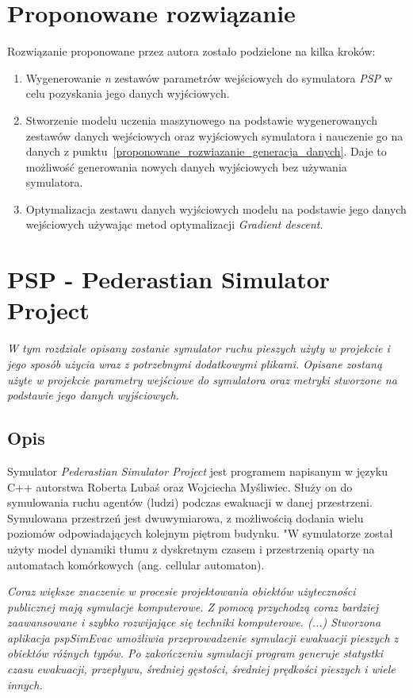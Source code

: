 \documentclass[12pt]{aghdpl}
\begin{document}
	\chapter{Proponowane rozwiązanie}
	Rozwiązanie proponowane przez autora zostało podzielone na kilka kroków:
	\begin{enumerate}
	\item\label{proponowane_rozwiazanie_generacja_danych} Wygenerowanie \textit{n} zestawów parametrów wejściowych do symulatora \textit{PSP} w celu pozyskania jego danych wyjściowych.
	\item Stworzenie modelu uczenia maszynowego na podstawie wygenerowanych zestawów danych wejściowych oraz wyjściowych symulatora i nauczenie go na danych z punktu~\ref{proponowane_rozwiazanie_generacja_danych}. Daje to możliwość generowania nowych danych wyjściowych bez używania symulatora.
	\item Optymalizacja zestawu danych wyjściowych modelu na podstawie jego danych wejściowych używając metod optymalizacji \textit{Gradient descent}.
	\end{enumerate}
	
	\chapter{PSP - Pederastian Simulator Project} \label{sekcja_psp}
	\textit{W tym rozdziale opisany zostanie symulator ruchu pieszych użyty w projekcie i jego sposób użycia wraz z potrzebnymi dodatkowymi plikami. Opisane zostaną użyte w projekcie parametry wejściowe do symulatora oraz metryki stworzone na podstawie jego danych wyjściowych.}
	
		\section{Opis}
		Symulator \textit{Pederastian Simulator Project} jest programem napisanym w języku C++ autorstwa Roberta Lubaś oraz Wojciecha Myśliwiec. Służy on do symulowania ruchu agentów (ludzi) podczas ewakuacji w danej przestrzeni. Symulowana przestrzeń jest dwuwymiarowa, z możliwością dodania wielu poziomów odpowiadających kolejnym piętrom budynku. "W symulatorze został użyty model dynamiki tłumu z dyskretnym czasem i przestrzenią oparty na automatach komórkowych (ang. cellular automaton). \cite{Lubas2016}

		\textit{Coraz większe znaczenie w procesie projektowania obiektów użyteczności publicznej mają symulacje komputerowe. Z pomocą przychodzą coraz bardziej zaawansowane i szybko rozwijające się techniki komputerowe. (...) Stworzona aplikacja pspSimEvac umożliwia przeprowadzenie symulacji ewakuacji pieszych z obiektów różnych typów. Po zakończeniu symulacji program generuje statystki czasu ewakuacji, przepływu, średniej gęstości, średniej prędkości pieszych i wiele innych.}\cite{modelowanie_ewakuacji_pieszych}
		
\end{document}
